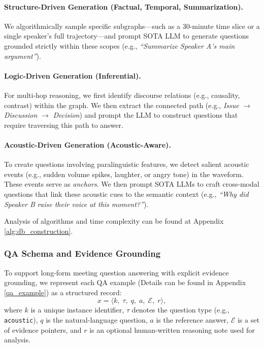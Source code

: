 \paragraph{Structure-Driven Generation (Factual, Temporal, Summarization).} 
We algorithmically sample specific subgraphs—such as a 30-minute time slice or a single speaker's full trajectory—and prompt SOTA LLM to generate questions grounded strictly within these scopes (e.g., \textit{``Summarize Speaker A's main argument''}).

\paragraph{Logic-Driven Generation (Inferential).} 
For multi-hop reasoning, we first identify discourse relations (e.g., causality, contrast) within the graph. We then extract the connected path (e.g., \textit{Issue} $\rightarrow$ \textit{Discussion} $\rightarrow$ \textit{Decision}) and prompt the LLM to construct questions that require traversing this path to answer.

\paragraph{Acoustic-Driven Generation (Acoustic-Aware).} 
To create questions involving paralinguistic features, we detect salient acoustic events (e.g., sudden volume spikes, laughter, or angry tone) in the waveform. These events serve as \textit{anchors}. We then prompt SOTA LLMs to craft cross-modal questions that link these acoustic cues to the semantic context (e.g., \textit{``Why did Speaker B raise their voice at this moment?''}).

Analysis of algorithms and time complexity can be found at Appendix \ref{alg:db_construction}.

\subsubsection{QA Schema and Evidence Grounding}
\label{sec:qa_schema}

To support long-form meeting question answering with explicit evidence grounding, we represent each QA example (Details can be found in Appendix \ref{qa_example}) as a structured record:
\begin{equation}
x = \langle k,\; \tau,\; q,\; a,\; \mathcal{E},\; r \rangle,
\end{equation}
where $k$ is a unique instance identifier, $\tau$ denotes the question type (e.g., \texttt{acoustic}), $q$ is the natural-language question, $a$ is the reference answer, $\mathcal{E}$ is a set of evidence pointers, and $r$ is an optional human-written reasoning note used for analysis.

